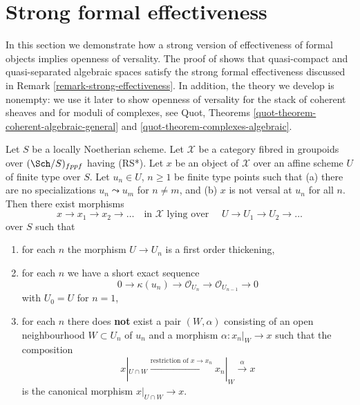 \section{Strong formal effectiveness}
\label{section-strong-formal-effectiveness}

\noindent
In this section we demonstrate how a strong version of effectiveness
of formal objects implies openness of versality. The proof of
\cite[Theorem 1.1]{Bhatt-Algebraize} shows that quasi-compact and
quasi-separated algebraic spaces satisfy the strong formal effectiveness
discussed in Remark \ref{remark-strong-effectiveness}. In addition, the
theory we develop is nonempty: we use it later to show openness of versality
for the stack of coherent sheaves and for moduli of complexes, see
Quot, Theorems
\ref{quot-theorem-coherent-algebraic-general} and
\ref{quot-theorem-complexes-algebraic}.

\begin{lemma}
\label{lemma-infinite-sequence-pre}
Let $S$ be a locally Noetherian scheme. Let $\mathcal{X}$ be a category
fibred in groupoids over $(\Sch/S)_{fppf}$ having (RS*).
Let $x$ be an object of
$\mathcal{X}$ over an affine scheme $U$ of finite type over $S$.
Let $u_n \in U$, $n \geq 1$ be finite type points such that
(a) there are no specializations $u_n \leadsto u_m$ for $n \not = m$, and
(b) $x$ is not versal at $u_n$ for all $n$. Then there exist morphisms
$$
x \to x_1 \to x_2 \to \ldots
\quad\text{in }\mathcal{X}\text{ lying over }\quad
U \to U_1 \to U_2 \to \ldots
$$
over $S$ such that
\begin{enumerate}
\item for each $n$ the morphism $U \to U_n$ is a first order
thickening,
\item for each $n$ we have a short exact sequence
$$
0 \to \kappa(u_n) \to \mathcal{O}_{U_n} \to \mathcal{O}_{U_{n - 1}} \to 0
$$
with $U_0 = U$ for $n = 1$,
\item for each $n$ there does {\bf not} exist a pair $(W, \alpha)$
consisting of an open neighbourhood $W \subset U_n$ of $u_n$
and a morphism $\alpha : x_n|_W \to x$
such that the composition
$$
x|_{U \cap W} \xrightarrow{\text{restriction of }x \to x_n}
x_n|_W \xrightarrow{\alpha} x
$$
is the canonical morphism $x|_{U \cap W} \to x$.
\end{enumerate}
\end{lemma}

